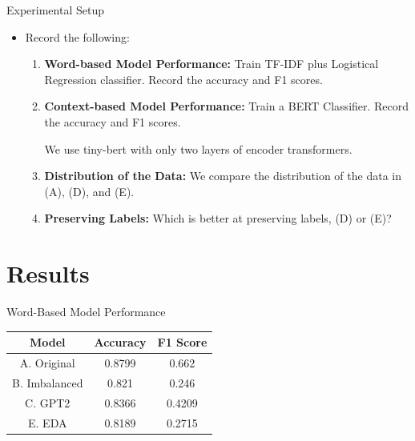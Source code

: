 \documentclass{beamer}
\begin{document}
\begin{frame}{Experimental Setup}
\begin{itemize}

\item<1-> Record the following:
\begin{enumerate}[(1)]
    
    \item<1-> \textbf{Word-based Model Performance:} Train TF-IDF plus Logistical Regression classifier. Record the accuracy and F1 scores. 
    
    \textbf{}
    
    \item<2-> \textbf{Context-based Model Performance:} Train a BERT Classifier. Record the accuracy and F1 scores. 
    
    We use tiny-bert with only two layers of encoder transformers.
    
    \textbf{}
    
    \item<3-> \textbf{Distribution of the Data:} We compare the distribution of the data in (A), (D), and (E).
    
    \textbf{}
    
    \item<4-> \textbf{Preserving Labels:} Which is better at preserving labels, (D) or (E)?
\end{enumerate}

\end{itemize}
\end{frame}

\section{Results}
\begin{frame}{Word-Based Model Performance}

\begin{center}
\begin{tabular}{||c c c||} 
 \hline
 Model & Accuracy & F1 Score \\ [0.5ex] 
 \hline\hline
 A. Original & 0.8799 & 0.662  \\ 
 \hline
 B. Imbalanced & 0.821 &  0.246 \\
 \hline
 C. GPT2 & 0.8366 &  0.4209 \\
 \hline
 E. EDA &  0.8189 & 0.2715 \\
 [1ex] 
 \hline
\end{tabular}
\end{center}

\end{frame}
\end{document}
